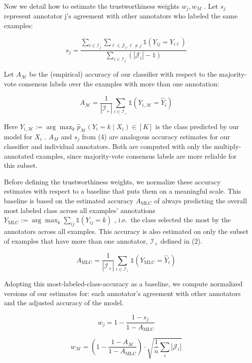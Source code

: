 \documentclass[
]{article}
\begin{document}
Now we detail how to estimate the trustworthiness weights
\(w_{j}, w_{M}\) . Let \(s_{j}\) represent annotator j's agreement with
other annotators who labeled the same examples:

\[
s _ {j} = \frac {\sum_ {i \in \mathcal {I} _ {j}} \sum_ {\ell \in \mathcal {J} _ {i} , \ell \neq j} \mathbb {1} \left(Y _ {i j} = Y _ {i \ell}\right)}{\sum_ {i \in \mathcal {I} _ {j}} \left(\left| \mathcal {J} _ {i} \right| - 1\right)} \tag {4}
\]

Let \(A_{\mathcal{M}}\) be the (empirical) accuracy of our classifier
with respect to the majority-vote consensus labels over the examples
with more than one annotation:

\[
A _ {\mathcal {M}} = \frac {1}{| \mathcal {I} _ {+} |} \sum_ {i \in \mathcal {I} _ {+}} \mathbb {1} \left(Y _ {i, \mathcal {M}} = \hat {Y} _ {i}\right) \tag {5}
\]

Here
\(Y_{i,\mathcal{M}} := \arg \max_{k} \widehat{p}_{\mathcal{M}}(Y_{i} = k \mid X_{i}) \in [K]\)
is the class predicted by our model for \(X_{i}\) . \(A_{M}\) and
\(s_{j}\) from (4) are analogous accuracy estimates for our classifier
and individual annotators. Both are computed with only the
multiply-annotated examples, since majority-vote consensus labels are
more reliable for this subset.

Before defining the trustworthiness weights, we normalize these accuracy
estimates with respect to a baseline that puts them on a meaningful
scale. This baseline is based on the estimated accuracy
\(A_{\mathrm{MLC}}\) of always predicting the overall most labeled class
across all examples' annotations
\(Y_{\mathrm{MLC}} := \arg \max_k \sum_{ij} \mathbb{1}(Y_{ij} = k)\) ,
i.e.~the class selected the most by the annotators across all examples.
This accuracy is also estimated on only the subset of examples that have
more than one annotator, \(\mathcal{I}_+\) defined in (2).

\[
A _ {\mathrm{MLC}} = \frac {1}{| \mathcal {I} _ {+} |} \sum_ {i \in \mathcal {I} _ {+}} \mathbb {1} \left(Y _ {\mathrm{MLC}} = \widehat {Y} _ {i}\right) \tag {6}
\]

Adopting this most-labeled-class-accuracy as a baseline, we compute
normalized versions of our estimates for: each annotator's agreement
with other annotators and the adjusted accuracy of the model.

\[
w _ {j} = 1 - \frac {1 - s _ {j}}{1 - A _ {\mathrm{MLC}}} \tag {7}
\]

\[
w _ {\mathcal {M}} = \left(1 - \frac {1 - A _ {\mathcal {M}}}{1 - A _ {\mathrm{MLC}}}\right) \cdot \sqrt {\frac {1}{n} \sum_ {i} | \mathcal {J} _ {i} |} \tag {8}
\]
\end{document}

